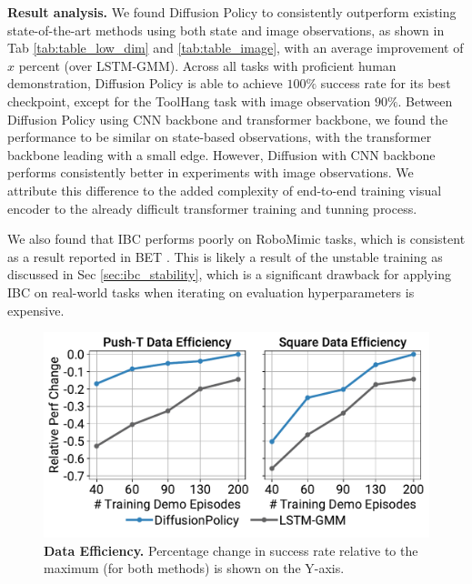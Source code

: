  \textbf{Result analysis.} We found Diffusion Policy to consistently outperform existing state-of-the-art methods using both state and image observations, as shown in Tab \ref{tab:table_low_dim} and \ref{tab:table_image}, with an average improvement of $x$ percent (over LSTM-GMM). Across all tasks with proficient human demonstration, Diffusion Policy is able to achieve $100\% $ success rate for its best checkpoint, except for the ToolHang task with image observation $90\% $.
 Between Diffusion Policy using CNN backbone and transformer backbone, we found the performance to be similar on state-based observations, with the transformer backbone leading with a small edge. However, Diffusion with CNN backbone performs consistently better in experiments with image observations. We attribute this difference to the added complexity of end-to-end training visual encoder to the already difficult transformer training and tunning process. %

We also found that IBC \cite{ibc} performs poorly on RoboMimic tasks, which is consistent as a result reported in BET \cite{bet}. This is likely a result of the unstable training as discussed in Sec \ref{sec:ibc_stability}, which is a significant drawback for applying IBC on real-world tasks when iterating on evaluation hyperparameters is expensive.


\begin{figure}[h]
\centering
\includegraphics[width=\linewidth]{figure/sample_efficiency_figure.pdf}

\caption{\textbf{Data Efficiency.}
\label{fig:data_efficiency}
Percentage change in success rate relative to the maximum (for both methods) is shown on the Y-axis.
}
\end{figure}


